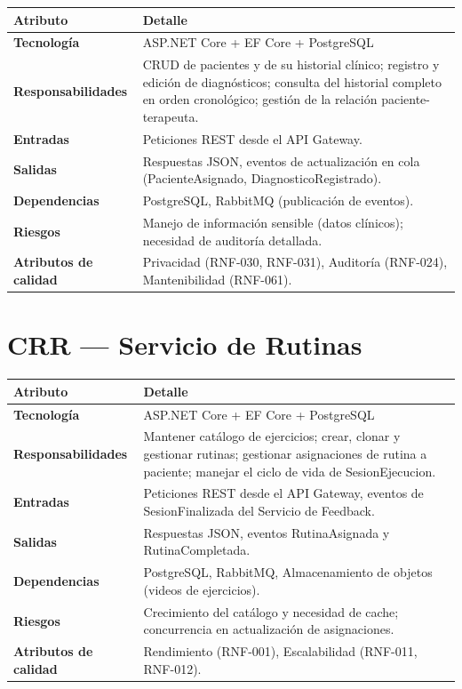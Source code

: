 \begin{tabularx}{\textwidth}{>{\bfseries}L{3.5cm} X}
  \toprule
  \textbf{\color{fmAccent}Atributo} & \textbf{\color{fmAccent}Detalle} \\
  \midrule
  Tecnología & ASP.NET Core + EF Core + PostgreSQL \\
  Responsabilidades & CRUD de pacientes y de su historial clínico; registro y edición de diagnósticos; consulta del historial completo en orden cronológico; gestión de la relación paciente-terapeuta. \\
  Entradas & Peticiones REST desde el API Gateway. \\
  Salidas & Respuestas JSON, eventos de actualización en cola (PacienteAsignado, DiagnosticoRegistrado). \\
  Dependencias & PostgreSQL, RabbitMQ (publicación de eventos). \\
  Riesgos & Manejo de información sensible (datos clínicos); necesidad de auditoría detallada. \\
  Atributos de calidad & Privacidad (RNF-030, RNF-031), Auditoría (RNF-024), Mantenibilidad (RNF-061). \\
  \bottomrule
\end{tabularx}

\section{CRR --- Servicio de Rutinas}

\begin{tabularx}{\textwidth}{>{\bfseries}L{3.5cm} X}
  \toprule
  \textbf{\color{fmAccent}Atributo} & \textbf{\color{fmAccent}Detalle} \\
  \midrule
  Tecnología & ASP.NET Core + EF Core + PostgreSQL \\
  Responsabilidades & Mantener catálogo de ejercicios; crear, clonar y gestionar rutinas; gestionar asignaciones de rutina a paciente; manejar el ciclo de vida de SesionEjecucion. \\
  Entradas & Peticiones REST desde el API Gateway, eventos de SesionFinalizada del Servicio de Feedback. \\
  Salidas & Respuestas JSON, eventos RutinaAsignada y RutinaCompletada. \\
  Dependencias & PostgreSQL, RabbitMQ, Almacenamiento de objetos (videos de ejercicios). \\
  Riesgos & Crecimiento del catálogo y necesidad de cache; concurrencia en actualización de asignaciones. \\
  Atributos de calidad & Rendimiento (RNF-001), Escalabilidad (RNF-011, RNF-012). \\
  \bottomrule
\end{tabularx}

